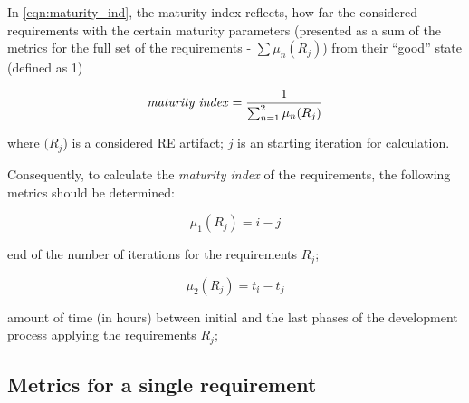 In \autoref{eqn:maturity_ind}, the maturity index reflects, how far the considered requirements with the certain maturity parameters (presented as a sum of the metrics for the full set of the requirements - $\sum\mu_{n}(R_{j})$) from their ``good'' state (defined as 1)

  \begin{equation}\label{eqn:maturity_ind}
\textrm{\textit{maturity index}} = \frac{1}{\sum_{n=1}^{2}\mu_{n}(R_{j})}
	\end{equation}

where $(R_{j}$) is a considered RE artifact; $j$ is an starting iteration for calculation.

Consequently, to calculate the \textit{maturity index} of the requirements, the following metrics should be determined:

 \begin{equation}\label{eqn:mu1}
\mu_{1}(R_{j}) = i-j
	\end{equation}
	
\textrm{end of the number of iterations for the requirements} $R_{j}$;

 \begin{equation}\label{eqn:mu2}
\mu_{2}(R_{j}) = t_{i}\acute{}-t_{j}    
 \end{equation}

\textrm{amount of time (in hours) between initial and the last phases of the development process applying the requirements} $R_{j}$;

%



\subsection{Metrics for a single requirement}



